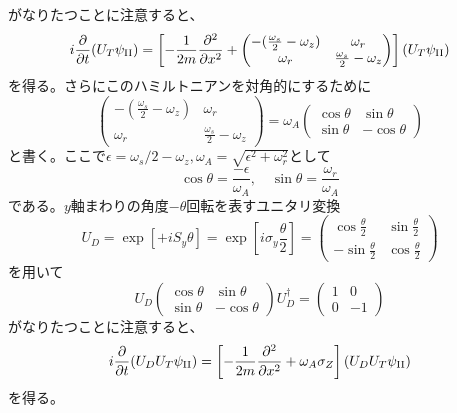 がなりたつことに注意すると、
\begin{equation}
i\frac{\partial}{\partial t}(U_T \psi_\mathrm{II}) =\left[-\frac{1}{2m} \frac{\partial^2}{\partial x^2} +\begin{pmatrix} -(\frac{\omega_s}{2}-\omega_z) &\omega_r\\ \omega_r &\frac{\omega_s}{2}-\omega_z \end{pmatrix}\right] (U_T \psi_\mathrm{II})
\end{equation}
を得る。さらにこのハミルトニアンを対角的にするために
\begin{equation}
\begin{pmatrix} -(\frac{\omega_s}{2}-\omega_z) &\omega_r\\ \omega_r &\frac{\omega_s}{2}-\omega_z \end{pmatrix}=\omega_A\begin{pmatrix} \cos \theta&\sin \theta\\ \sin \theta &-\cos \theta \end{pmatrix}
\end{equation}
と書く。ここで$\epsilon=\omega_s/2-\omega_z,\omega_A=\sqrt{\epsilon^2+\omega_r^2}$として
\begin{equation}
\cos \theta=\frac{-\epsilon}{\omega_A} , \quad \sin \theta=\frac{\omega_r}{\omega_A}
\end{equation}
である。$y$軸まわりの角度$-\theta$回転を表すユニタリ変換
\begin{equation}
U_D=\exp\left[+iS_y \theta\right] =\exp\left[i\sigma_y \frac{\theta}{2}\right] =\begin{pmatrix} \cos\frac{\theta}{2}& \sin\frac{\theta}{2}\\  -\sin\frac{\theta}{2}& \cos\frac{\theta}{2}\end{pmatrix}
\end{equation}
を用いて
\begin{equation}
U_D \begin{pmatrix} \cos \theta&\sin \theta\\ \sin \theta &-\cos \theta \end{pmatrix} U_D^\dagger =\begin{pmatrix} 1&0\\0&-1\end{pmatrix}
\end{equation}
がなりたつことに注意すると、
\begin{equation}
i\frac{\partial}{\partial t}(U_DU_T \psi_\mathrm{II}) =\left[-\frac{1}{2m} \frac{\partial^2}{\partial x^2} +\omega_A \sigma_Z \right] (U_DU_T \psi_\mathrm{II})
\end{equation}
を得る。

